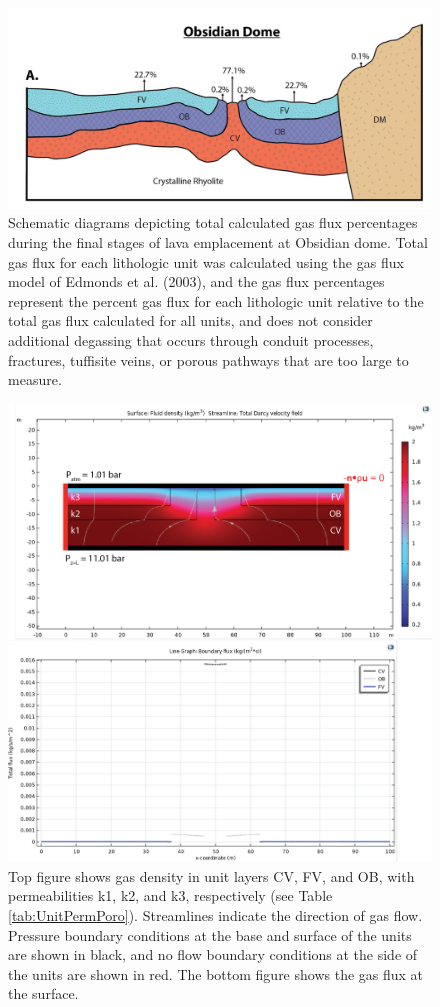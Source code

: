 \documentclass[11pt]{amsart}
\begin{document}
\begin{figure}
   \centering
\includegraphics[scale=0.5]{figs/crossSection.png}
\caption{Schematic diagrams depicting total calculated gas flux percentages during the final stages of lava emplacement at Obsidian dome. Total gas flux for each lithologic unit was calculated using the gas flux model of Edmonds et al. (2003), and the gas flux percentages represent the percent gas flux for each lithologic unit relative to the total gas flux calculated for all units, and does not consider additional degassing that occurs through conduit processes, fractures, tuffisite veins, or porous pathways that are too large to measure.}
\label{fig:crossSection}
\end{figure}

\begin{figure}
   \centering
\includegraphics[scale=0.8]{figs/comsolDarcyLaw_units.png}
\caption{Top figure shows gas density in unit layers CV, FV, and OB, with permeabilities k1, k2, and k3, respectively (see Table \ref{tab:UnitPermPoro}). Streamlines indicate the direction of gas flow. Pressure boundary conditions at the base and surface of the units are shown in black, and no flow boundary conditions at the side of the units are shown in red. The bottom figure shows the gas flux at the surface.}
\label{fig:COMSOLresults}
\end{figure}
\end{document}
